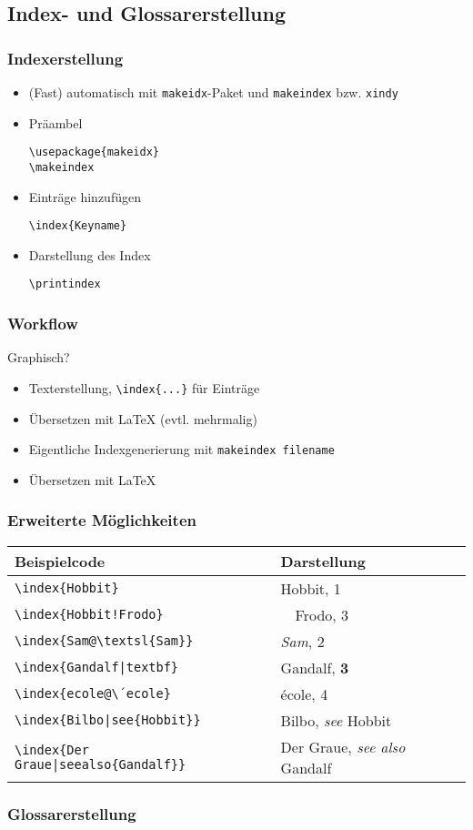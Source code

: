 \subsection{Index- und Glossarerstellung}
\begin{frame}[fragile]
  \frametitle{Indexerstellung}
  \begin{itemize}
  \item (Fast) automatisch mit \texttt{makeidx}-Paket und
    \texttt{makeindex} bzw. \texttt{xindy}
  \item Präambel
\begin{lstlisting}[language={[LaTeX]TeX}]
\usepackage{makeidx}
\makeindex
\end{lstlisting}
  \item Einträge hinzufügen
\begin{lstlisting}[language={[LaTeX]TeX}]
\index{Keyname}
\end{lstlisting}
  \item Darstellung des Index
\begin{lstlisting}[language={[LaTeX]TeX}]
\printindex
\end{lstlisting}
  \end{itemize}
\end{frame}

\begin{frame}
  \frametitle{Workflow}
  Graphisch?
  \begin{itemize}
  \item Texterstellung, \texttt{\textbackslash index\{...\}} für
    Einträge
  \item Übersetzen mit \LaTeX{} (evtl. mehrmalig)
  \item Eigentliche Indexgenerierung mit \texttt{makeindex filename}
  \item Übersetzen mit \LaTeX{}
  \end{itemize}
\end{frame}

\begin{frame}
  \frametitle{Erweiterte Möglichkeiten}
  \begin{tabular}{l|l}
    \textbf{Beispielcode} & \textbf{Darstellung}\\ \hline
    \texttt{\textbackslash index\{Hobbit\}} & Hobbit, 1\\
    \texttt{\textbackslash index\{Hobbit!Frodo\}} & $\quad$Frodo, 3\\
    \texttt{\textbackslash index\{Sam@\textbackslash textsl\{Sam\}\}}
    & \textsl{Sam}, 2\\
    \texttt{\textbackslash index\{Gandalf|textbf\}} & Gandalf, \textbf{3}\\
    \texttt{\textbackslash index\{ecole@\textbackslash ´ecole\}} &
    école, 4\\
    \texttt{\textbackslash index\{Bilbo|see\{Hobbit\}\}} & Bilbo,
    \emph{see} Hobbit\\
    \texttt{\textbackslash index\{Der Graue|seealso\{Gandalf\}\}} &
    Der Graue, \emph{see also} Gandalf
  \end{tabular}
\end{frame}

\begin{frame}
  \frametitle{Glossarerstellung}
  
\end{frame}
